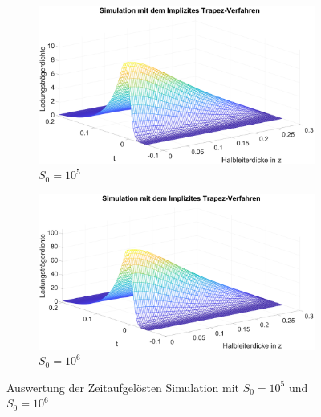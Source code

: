 \begin{figure}[h]
	
	\begin{subfigure}[b]{0.5\textwidth}
		\includegraphics[width=1\linewidth]{figures/zeitaufgeloeste/S1}
		\caption{$S_0=10^5$}
		
	\end{subfigure}
	\hfill
	\begin{subfigure}[b]{0.5\textwidth}
		\includegraphics[width=1\linewidth]{figures/zeitaufgeloeste/S2}
		\caption{$S_0=10^6$}
	\end{subfigure}
	\caption{Auswertung der Zeitaufgelösten Simulation mit $S_0=10^5$ und $S_0=10^6$ }
\end{figure}
